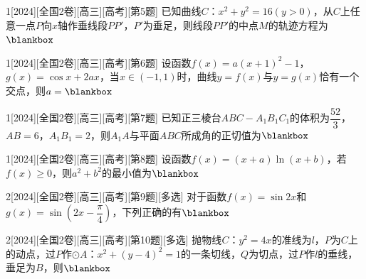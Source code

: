 \begin{example}{1}[2024][全国2卷][高三][高考][第5题]
已知曲线$C$：$x^2+y^2=16(y>0)$，从$C$上任意一点$P$向$x$轴作垂线段$PP'$，$P'$为垂足，则线段$PP'$的中点$M$的轨迹方程为$\blankbox$
\begin{choices}
\end{choices}
\end{example}

\begin{example}{1}[2024][全国2卷][高三][高考][第6题]
设函数$f(x)=a(x+1)^2-1$，$g(x)=\cos x+2ax$，当$x\in(-1,1)$时，曲线$y=f(x)$与$y=g(x)$恰有一个交点，则$a=\blankbox$
\begin{choices}
\end{choices}
\end{example}

\begin{example}{1}[2024][全国2卷][高三][高考][第7题]
已知正三棱台$ABC-A_1B_1C_1$的体积为$\dfrac{52}{3}$，$AB=6$，$A_1B_1=2$，则$A_1A$与平面$ABC$所成角的正切值为$\blankbox$
\begin{choices}
\end{choices}
\end{example}

\begin{example}{1}[2024][全国2卷][高三][高考][第8题]
设函数$f(x)=(x+a)\ln(x+b)$，若$f(x)\ge 0$，则$a^2+b^2$的最小值为$\blankbox$
\begin{choices}
\end{choices}
\end{example}
\begin{example}{2}[2024][全国2卷][高三][高考][第9题][多选]
对于函数$f(x)=\sin 2x$和$g(x)=\sin\left(2x-\dfrac{\pi}{4}\right)$，下列正确的有$\blankbox$
\begin{choices}
\end{choices}
\end{example}

\begin{example}{2}[2024][全国2卷][高三][高考][第10题][多选]
抛物线$C$：$y^2=4x$的准线为$l$，$P$为$C$上的动点，过$P$作$\odot A$：$x^2+(y-4)^2=1$的一条切线，$Q$为切点，过$P$作$l$的垂线，垂足为$B$，则$\blankbox$
\begin{choices}
\end{choices}
\end{example}

